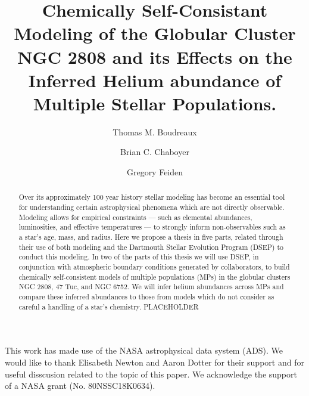 \documentclass[twocolumn,linenumbers]{src/aastex631}
\begin{document}
\title{Chemically Self-Consistant Modeling of the Globular Cluster NGC 2808 and its Effects on the Inferred Helium abundance of Multiple Stellar Populations.}


\author[0000-0002-2600-7513]{Thomas M. Boudreaux}

\author[0000-0003-3096-4161]{Brian C. Chaboyer}

\author[0000-0002-2012-7215]{Gregory Feiden}


\begin{abstract}
	Over its approximately 100 year history stellar modeling has become an
	essential tool for understanding certain astrophysical phenomena which are not
	directly observable. Modeling allows for empirical constraints --- such as
	elemental abundances, luminosities, and effective temperatures --- to strongly
	inform non-observables such as a star's age, mass, and radius. Here we propose a
	thesis in five parts, related through their use of both modeling and the
	Dartmouth Stellar Evolution Program (DSEP) to conduct this modeling. In two of
	the parts of this thesis we will use DSEP, in conjunction with atmospheric
	boundary conditions generated by collaborators, to build chemically
	self-consistent models of multiple populations (MPs) in the globular clusters
	NGC 2808, 47 Tuc, and NGC 6752. We will infer helium abundances across MPs and
	compare these inferred abundances to those from models which do not consider as
	careful a handling of a star's chemistry. PLACEHOLDER
\end{abstract}

\keywords{}




\begin{acknowledgments}
	This work has made use of the NASA astrophysical data system (ADS). We
	would like to thank Elisabeth Newton and Aaron Dotter for their support and
	for useful disscusion related to the topic of this paper. We acknowledge
	the support of a NASA grant (No. 80NSSC18K0634). 
\end{acknowledgments}



{}

\end{document}
